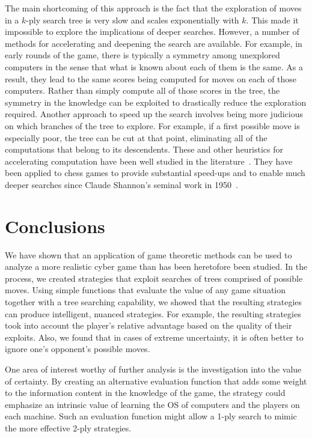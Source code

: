 \documentclass{sig-alternate}
\begin{document}
The main shortcoming of this approach is the fact that the
exploration of moves in a $k$-ply search tree is very slow and scales
exponentially with $k$. This made it impossible to explore the
implications of deeper searches. However, a number of methods
for accelerating and deepening the search are available. For example,
in early rounds of the game, there is typically a symmetry among unexplored
computers in the sense that what is known about each of them is the
same. As a result, they lead to the same scores being computed for
moves on each of those computers. 
Rather
than simply compute all of those scores in the tree, the symmetry in
the knowledge can be exploited to drastically reduce the exploration
required. Another approach to speed up the search involves being
more judicious on which branches of the tree to explore. For example,
if a first possible move is especially poor, the tree can be cut at
that point, eliminating all of the computations that belong to its
descendents. These and other heuristics for accelerating computation
have been well studied in the literature~\cite{levy2009computer}. They
have been applied to chess games to provide substantial speed-ups and
to enable much deeper searches since Claude Shannon's seminal work in
1950~\cite{shannon1950programming}.





\section{Conclusions}
\label{sec:conc}

We have shown that an application of game theoretic methods can be used
to analyze a more realistic cyber game than has been heretofore been
studied. In the process, we created strategies that exploit searches
of trees comprised of possible moves. Using simple functions that
evaluate the value of any game situation together with a tree
searching capability, we showed that the resulting strategies can
produce intelligent, nuanced strategies. For example, the resulting
strategies took into account the player's relative advantage based on
the quality of their exploits.  Also, we found that in cases of
extreme uncertainty, it is often better to ignore one's opponent's
possible moves.

One area of interest worthy of further analysis is the investigation
into the value of certainty. 
By creating an alternative
evaluation function that adds some weight to the information content in
the knowledge of the game, the strategy could emphasize an intrinsic
value of learning the OS of computers and the players on each
machine. Such an evaluation function might allow a 1-ply search to
mimic the more effective 2-ply strategies.
\end{document}
